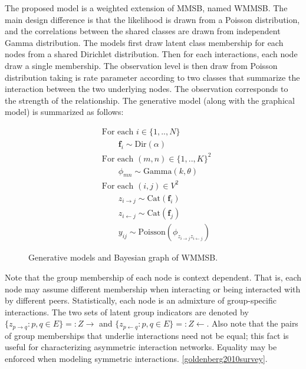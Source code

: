The proposed model is a weighted extension of MMSB, named WMMSB. The main design difference is that the likelihood is drawn from a Poisson distribution, and the correlations between the shared classes are drawn from independent Gamma distribution. The models first draw latent class membership for each nodes from a shared Dirichlet distribution. Then for each interactions, each node draw a single membership. The observation level is then draw from Poisson distribution taking is rate parameter according to two classes that summarize the interaction between the two underlying nodes. The observation corresponds to the strength of the relationship. The generative model (along  with the graphical model) is summarized as follows:

\begin{figure}[h]
\begin{minipage}[h]{0.45\linewidth}
\begin{align*}
	&\textrm{For each } i \in \{1, .., N\}  \\
	&\qquad\bm{f}_i \sim \textrm{Dir}(\alpha)\\
	&\textrm{For each }  (m,n) \in \{1,..,K\}^2 \\
	&\qquad\phi_{mn} \sim \mathrm{Gamma}(k,\theta)\\
	&\textrm{For each } (i,j) \in V^2 \\
	&\qquad z_{i \rightarrow j} \sim \mbox{Cat}(\bm{f}_i)\\
	&\qquad z_{i \leftarrow j} \sim \mbox{Cat}(\bm{f}_j)\\
    &\qquad y_{ij} \sim \mathrm{Poisson}(\phi_{z_{i \rightarrow j}z_{i \leftarrow j}})
\end{align*}
\end{minipage}
\begin{minipage}[h]{0.45\linewidth}
	\scalebox{0.88}{}
\end{minipage}
    \caption{Generative models and Bayesian graph of WMMSB.}
\end{figure}

Note that the group membership of each node is context dependent. That is, each node may assume different membership when interacting or being interacted with by different peers. Statistically, each node is an admixture of group-specific interactions. The two sets of latent group indicators are denoted by $\{z_{p\rightarrow q} : p, q \in E\}  =: Z\rightarrow$ and $\{z_{p\leftarrow q} : p, q \in E\}  =: Z\leftarrow$. Also note that the pairs of group memberships that underlie interactions need not be equal; this fact is useful for characterizing asymmetric interaction networks. Equality may be enforced when modeling symmetric interactions. \ref{goldenberg2010survey}.


